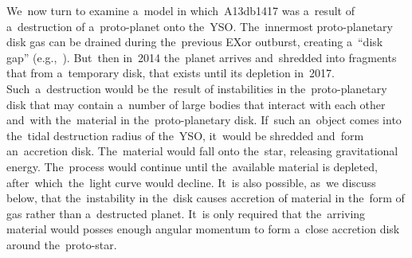 \documentclass[galaxies,article,accept,moreauthors,pdftex]{mdpi}
\begin{document}
We~now turn to examine a~model in which~A13db1417 was a~result of a~destruction of a~proto-planet onto the~YSO. The~innermost proto-planetary disk gas can be drained during the~previous EXor outburst, creating a~``disk gap'' (e.g.,~\cite{Gotoetal2011,BanzattiPontoppidan2015}). But~then in~2014 the~planet arrives and~shredded into fragments that from a~temporary disk, that exists until its depletion in~2017. Such~a~destruction would be the~result of instabilities in the~proto-planetary disk that may contain a~number of large bodies that interact with each other and~with the~material in the~proto-planetary disk. If~such an~object comes into the~tidal destruction radius of the~YSO, it~would be shredded and~form an~accretion disk. The~material would fall onto the~star, releasing gravitational energy. The~process would continue until the~available material is depleted, after~which~the~light curve would decline. It~is also possible, as~we discuss below, that the~instability in the~disk causes accretion of material in the~form of gas rather than a~destructed planet. It~is only required that the~arriving material would posses enough angular momentum to form a~close accretion disk around the~proto-star.
\end{document}
